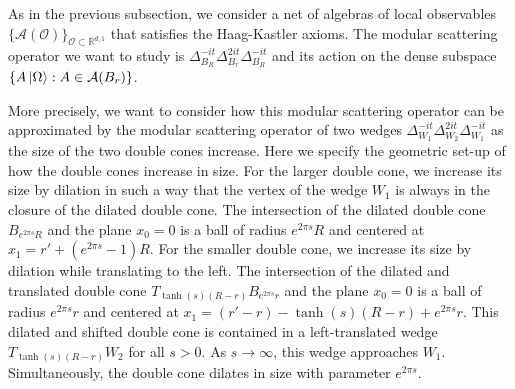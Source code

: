 \documentclass[a4paper,11pt]{article}
\theoremstyle{definition}
\begin{document}
As in the previous subsection, we consider a net of algebras of local observables $\{\mathcal{A}(\mathcal{O})\}_{\mathcal{O}\subset\mathbb{R}^{d,1}}$ that satisfies the Haag-Kastler axioms. The modular scattering operator we want to study is $\Delta_{B_R}^{-it}\Delta_{B_r}^{2it}\Delta_{B_R}^{-it}$ and its action on the dense subspace $\{A\ket{\Omega}: A\in\mathcal{A}(B_r)\}$.

More precisely, we want to consider how this modular scattering operator can be approximated by the modular scattering operator of two wedges $\Delta_{W_1}^{-it}\Delta_{W_2}^{2it}\Delta_{W_1}^{-it}$ as the size of the two double cones increase. Here we specify the geometric set-up of how the double cones increase in size. For the larger double cone, we increase its size by dilation in such a way that the vertex of the wedge $W_1$ is always in the closure of the dilated double cone. The intersection of the dilated double cone $B_{e^{2\pi s}R}$ and the plane $x_0 = 0$ is a ball of radius $e^{2\pi s}R$ and centered at $x_1 = r' + (e^{2\pi s} - 1)R$. For the smaller double cone, we increase its size by dilation while translating to the left. The intersection of the dilated and translated double cone $T_{\tanh(s)(R - r)}B_{e^{2\pi s}r}$ and the plane $x_0 = 0$ is a ball of radius $e^{2\pi s}r$ and centered at $x_1 = (r' - r) - \tanh(s)(R - r) + e^{2\pi s}r$. This dilated and shifted double cone is contained in a left-translated wedge $T_{\tanh(s)(R - r)}W_2$ for all $s > 0$. As $s\rightarrow\infty$, this wedge approaches $W_1$. Simultaneously, the double cone dilates in size with parameter $e^{2\pi s}$.
\end{document}
